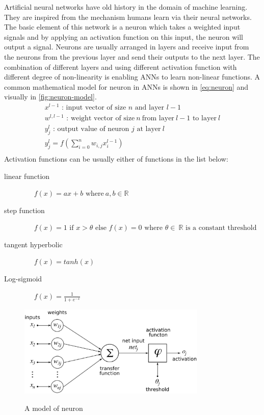 Artificial neural networks have old history in the domain of machine learning.
They are inspired from the mechanism humans learn via their neural networks. The
basic element of this network is a neuron which takes a weighted input signals and by applying an activation function
on this input, the neuron will output a signal. 
 Neurons are usually arranged in
layers and receive input from the neurons from the previous layer and send their
outputs to the next layer. The combination of different layers and using
different activation function with different degree of non-linearity is enabling
ANNs to learn non-linear functions.
A common mathematical model for neuron in ANNs is shown in
\eqref{eq:neuron} and visually in \autoref{fig:neuron-model}.
\begin{equation}
\label{eq:neuron}
\begin{split}
x^{l-1} \mbox{~: input vector of size~}n  \mbox{~and layer~}l-1
\\
w^{l,l-1} \mbox{~: weight vector of size}~n~ \text{from layer}~l-1 \text{~to
layer}~l
\\
y_{j}^{l} \mbox{~: output value of neuron~}j  \mbox{~at layer}~l\\
y_{j}^{l} = f(\sum_{i=0}^{n} w_{i,j}x_{i}^{l-1})\\
\end{split}
\end{equation} 
Activation functions can be
usually either of functions in the list below:
\begin{description}
\item[linear function] ~~ $f(x)=ax+b \mbox{~where}~ a,b \in \mathbb{R}$
\item[step function] ~~ $ f(x)=1 \mbox{~if~} x > \theta \mbox{~else~} f(x)=0
\mbox{~where~}\theta \in \mathbb{~R} \mbox{~is a constant threshold} $
\item[tangent hyperbolic] ~~ $f(x)=tanh(x)$
\item[Log-sigmoid] ~~ $f(x)=\frac{1}{1+e^{-x}}$
\end{description}

    \begin{figure}[h!]
  \caption{A model of neuron}
  \centering
    \includegraphics[width=0.8\textwidth]{neuron-model.eps}
    \label{fig:neuron-model}
\end{figure} 

